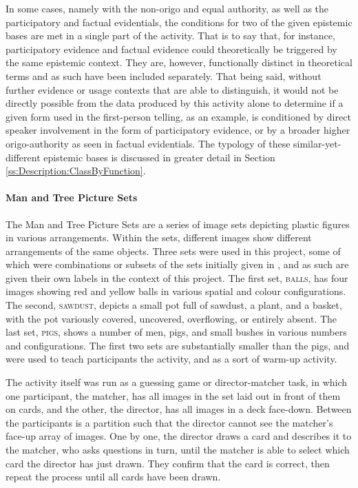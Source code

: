 In some cases, namely with the non-origo and equal authority, as well as the participatory and factual evidentials, the conditions for two of the given epistemic bases are met in a single part of the activity. That is to say that, for instance, participatory evidence and factual evidence could theoretically be triggered by the same epistemic context. They are, however, functionally distinct in theoretical terms and as such have been included separately. That being said, without further evidence or usage contexts that are able to distinguish, it would not be directly possible from the data produced by this activity alone to determine if a given form used in the first-person telling, as an example, is conditioned by direct speaker involvement in the form of participatory evidence, or by a broader higher origo-authority as seen in factual evidentials. The typology of these similar-yet-different epistemic bases is discussed in greater detail in Section \ref{ss:Description:ClassByFunction}.

\paragraph{Man and Tree Picture Sets}
The Man and Tree Picture Sets \cite{Levinson1992} are a series of image sets depicting plastic figures in various arrangements. Within the sets, different images show different arrangements of the same objects. Three sets were used in this project, some of which were combinations or subsets of the sets initially given in , and as such are given their own labels in the context of this project. The first set, \textsc{balls}, has four images showing red and yellow balls in various spatial and colour configurations. The second, \textsc{sawdust}, depicts a small pot full of sawdust, a plant, and a basket, with the pot variously covered, uncovered, overflowing, or entirely absent. The last set, \textsc{pigs}, shows a number of men, pigs, and small bushes in various numbers and configurations. The first two sets are substantially smaller than the {pigs}, and were used to teach participants the activity, and as a sort of warm-up activity.

The activity itself was run as a guessing game or director-matcher task, in which one participant, the matcher, has all images in the set laid out in front of them on cards, and the other, the director, has all images in a deck face-down. Between the participants is a partition such that the director cannot see the matcher's face-up array of images. One by one, the director draws a card and describes it to the matcher, who asks questions in turn, until the matcher is able to select which card the director has just drawn. They confirm that the card is correct, then repeat the process until all cards have been drawn.

